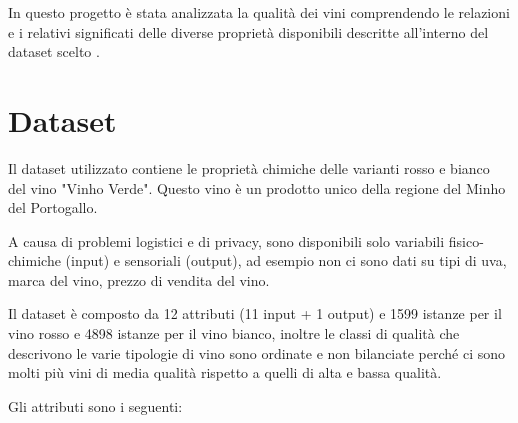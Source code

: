 \noindent
In questo progetto è stata analizzata la qualità dei vini comprendendo le relazioni e i relativi significati delle diverse proprietà disponibili descritte all'interno del dataset scelto \cite{cortez2009modeling}.

\section{Dataset}
\label{ch:dataset}

Il dataset utilizzato contiene le proprietà chimiche delle varianti rosso e bianco del vino "Vinho Verde". Questo vino è un prodotto unico della regione del Minho del Portogallo.

\noindent
A causa di problemi logistici e di privacy, sono disponibili solo variabili fisico-chimiche (input) e sensoriali (output), ad esempio non ci sono dati su tipi di uva, marca del vino, prezzo di vendita del vino.

\noindent
Il dataset è composto da 12 attributi (11 input + 1 output) e 1599 istanze per il vino rosso e 4898 istanze per il vino bianco, inoltre le classi di qualità che descrivono le varie tipologie di vino sono ordinate e non bilanciate perché ci sono molti più vini di media qualità rispetto a quelli di alta e bassa qualità.

\vspace{4mm}
\noindent
Gli attributi sono i seguenti:

